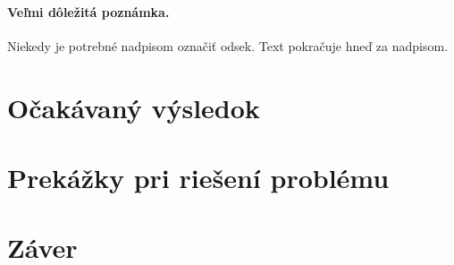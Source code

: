 \documentclass[10pt,twoside,slovak,a4paper]{article}
\begin{document}
\paragraph{Veľmi dôležitá poznámka.}
Niekedy je potrebné nadpisom označiť odsek. Text pokračuje hneď za nadpisom.



\section{Očakávaný výsledok} \label{ocakavanie}




\section{Prekážky pri riešení problému} \label{prekazky}




\section{Záver} \label{zaver} %






\end{document}
